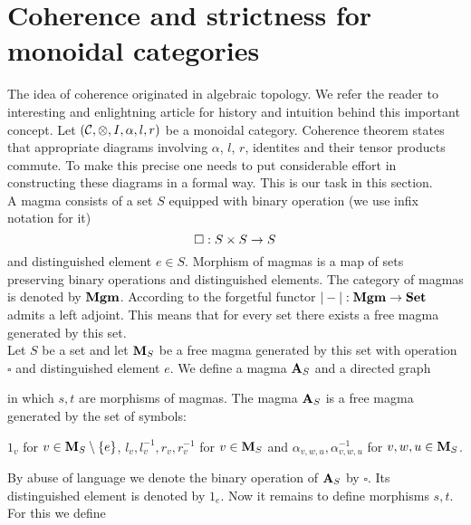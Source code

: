 \section{Coherence and strictness for monoidal categories}
\noindent
The idea of coherence originated in algebraic topology. We refer the reader to interesting and enlightning article \cite{maclane1963natural} for history and intuition behind this important concept. Let $({\mathcal C},\otimes, I,\alpha, l, r)$ be a monoidal category. Coherence theorem states that appropriate diagrams involving $\alpha$, $l$, $r$, identites and their tensor products commute. To make this precise one needs to put considerable effort in constructing these diagrams in a formal way. This is our task in this section.\\
A magma consists of a set $S$ equipped with binary operation (we use infix notation for it)
$$\square:S\times S\rightarrow S$$
and distinguished element $e\in S$. Morphism of magmas is a map of sets preserving binary operations and distinguished elements. The category of magmas is denoted by $\mathbf{Mgm}$. According to {\cite[Corollary 3.7.8]{borceux1994handbook}} the forgetful functor $|-|:\mathbf{Mgm}\rightarrow \mathbf{Set}$ admits a left adjoint. This means that for every set there exists a free magma generated by this set.\\
Let $S$ be a set and let $\mathbf{M}_S$ be a free magma generated by this set with operation $\square$ and distinguished element $e$. We define a magma $\mathbf{A}_S$ and a directed graph
\begin{center}
\end{center}
in which $s, t$ are morphisms of magmas. The magma $\mathbf{A}_S$ is a free magma generated by the set of symbols:
\begin{center}
$1_v$ for $v\in \mathbf{M}_S\setminus \{e\}$, $l_v,l^{-1}_v,r_v,r^{-1}_v$ for $v\in \mathbf{M}_S$ and $\alpha_{v,w,u},\alpha^{-1}_{v,w,u}$ for $v,w,u\in \mathbf{M}_S$.
\end{center}
By abuse of language we denote the binary operation of $\mathbf{A}_S$ by $\square$. Its distinguished element is denoted by $1_e$. Now it remains to define morphisms $s,t$. For this we define
